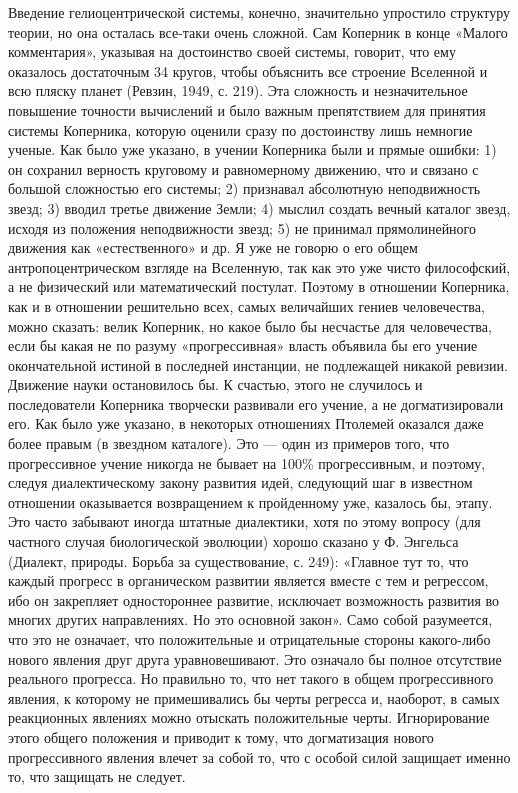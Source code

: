 Введение  гелиоцентрической  системы, конечно,  значительно  упростило
структуру теории, но она осталась все-таки очень сложной. Сам Коперник
в конце  «Малого комментария», указывая на  достоинство своей системы,
говорит, что ему оказалось достаточным  34 кругов, чтобы объяснить все
строение Вселенной  и всю  пляску планет (Ревзин,  1949, с.  219). Эта
сложность и незначительное повышение точности вычислений и было важным
препятствием для принятия системы  Коперника, которую оценили сразу по
достоинству  лишь немногие  ученые.  Как было  уже  указано, в  учении
Коперника  были и  прямые ошибки:  1) он  сохранил верность  круговому
и  равномерному  движению, что  и  связано  с большой  сложностью  его
системы; 2) признавал абсолютную неподвижность звезд; 3) вводил третье
движение  Земли;  4)  мыслил  создать  вечный  каталог  звезд,  исходя
из  положения  неподвижности  звезд;  5)  не  принимал  прямолинейного
движения  как «естественного»  и  др.  Я уже  не  говорю  о его  общем
антропоцентрическом  взгляде  на  Вселенную,  так как  это  уже  чисто
философский,  а не  физический  или  математический постулат.  Поэтому
в  отношении  Коперника, как  и  в  отношении решительно  всех,  самых
величайших  гениев человечества,  можно  сказать:  велик Коперник,  но
какое было бы  несчастье для человечества, если бы какая  не по разуму
«прогрессивная» власть объявила бы  его учение окончательной истиной в
последней  инстанции, не  подлежащей никакой  ревизии. Движение  науки
остановилось  бы.  К  счастью,  этого  не  случилось  и  последователи
Коперника творчески  развивали его  учение, а не  догматизировали его.
Как было  уже указано, в  некоторых отношениях Птолемей  оказался даже
более правым (в звездном каталоге). Это --- один из примеров того, что
прогрессивное  учение  никогда не  бывает  на  100\% прогрессивным,  и
поэтому, следуя  диалектическому закону  развития идей,  следующий шаг
в  известном отношении  оказывается  возвращением  к пройденному  уже,
казалось бы, этапу. Это часто забывают иногда штатные диалектики, хотя
по этому  вопросу (для частного случая  биологической эволюции) хорошо
сказано  у Ф.  Энгельса  (Диалект, природы.  Борьба за  существование,
с.  249):  «Главное  тут  то,   что  каждый  прогресс  в  органическом
развитии  является  вместе  с  тем  и  регрессом,  ибо  он  закрепляет
одностороннее  развитие,  исключает  возможность  развития  во  многих
других направлениях.  Но это  основной закон». Само  собой разумеется,
что  это  не  означает,  что  положительные  и  отрицательные  стороны
какого-либо нового явления друг  друга уравновешивают. Это означало бы
полное отсутствие реального прогресса. Но правильно то, что нет такого
в общем прогрессивного  явления, к которому не  примешивались бы черты
регресса  и, наоборот,  в  самых реакционных  явлениях можно  отыскать
положительные черты. Игнорирование этого общего положения и приводит к
тому, что  догматизация нового прогрессивного явления  влечет за собой
то, что с особой силой защищает именно то, что защищать не следует.

